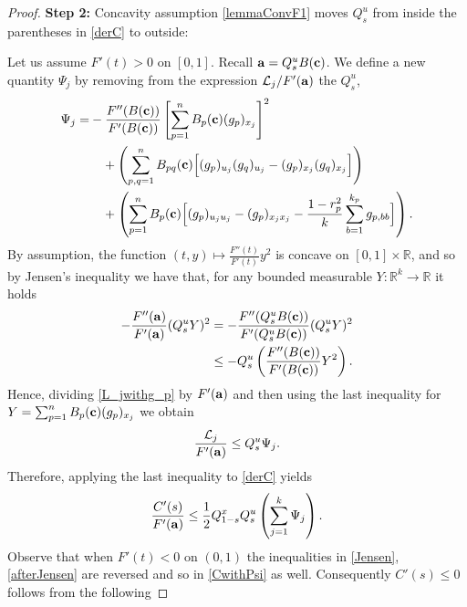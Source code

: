 \documentclass[9pt, a4paper]{amsart}
\newcommand{\R}{\mathbb{R}}
\newcommand{\1}{{\chi_{}}}%
\numberwithin{equation}{section}
\begin{document}
\begin{proof}
\vspace{0.2cm}


{\textbf{Step 2:}} Concavity assumption \eqref{lemmaConvF1} moves $Q^u_s$ from inside the parentheses in \eqref{derC} to outside:

\vspace{0.2cm}



Let us assume $F'(t)>0$ on $[0,1]$. Recall ${\bf{a}}=Q_{s}^{u}B({\bf{c}})$. We define a new quantity $\Psi_j$ by removing from the expression $\mathcal{L}_j/F'({\bf{a}})$ the $Q^u_s$,
\begin{align}\label{Psi_j}
	\Psi_j=&-\frac{F''({B(\bf{c}}))}{F'(B({\bf{c}}))}\left[\sum_{p=1}^nB_{p}({\bf{c}})(g_p)_{x_j}\right]^2\\   
	&\quad\nonumber+\left(\sum_{p,q=1}^{n}B_{pq}({\bf{c}})\Big[(g_p)_{u_j}(g_q)_{u_j}-(g_p)_{x_j}(g_q)_{x_j}\Big] \right)\\
	&\quad\nonumber+\left(\sum_{p=1}^nB_{p}({\bf{c}})\Big[(g_p)_{u_ju_j}-(g_p)_{x_jx_j}-\frac{1-r_p^2}{k}\sum_{b=1}^{k_p}g_{p,bb}\Big]\right).
\end{align}
By assumption, the function $(t,y)\mapsto \frac{F''(t)}{F'(t)}y^2$ is concave on $[0,1]\times \mathbb{R}$, and so by Jensen's inequality we have that, for any bounded measurable $Y:\R^k\to\R$ it holds
\begin{align}\label{Jensen}
\nonumber- \frac{F''({\bf{a}})}{F'({\bf{a}})}(Q_s^uY)^2 &=-\frac{F''(Q_{s}^{u}B({\bf{c}}))}{F'(Q_{s}^{u}B({\bf{c}}))}(Q_s^uY)^2  \\
	&\leq- Q_{s}^{u}\left( \frac{F''(B({\bf{c}}))}{F'(B({\bf{c}}))}Y^2\right).
\end{align}
Hence, dividing \eqref{L_jwithg_p} by $F'({\bf{a}})$ and then using the last inequality for $Y=\sum_{p=1}^nB_{p}({\bf{c}})(g_p)_{x_j}$ we obtain
\begin{equation}\label{afterJensen}
	\frac{\mathcal{L}_j}{F'({\bf{a}})}\leq Q_s^u\Psi_j.
\end{equation}
Therefore, applying the last inequality to \eqref{derC} yields
\begin{equation}\label{CwithPsi}
\frac{C'(s)}{F'({\bf{a}})}\leq\frac{1}{2}Q_{1-s}^xQ_s^u\left(\sum_{j=1}^k\Psi_j\right).
\end{equation}
Observe that when $F'(t)<0$ on $(0,1)$ the inequalities in \eqref{Jensen}, \eqref{afterJensen} are reversed and so in \eqref{CwithPsi} as well. Consequently $C'(s)\leq0$ follows from the following   
\vspace{0.2cm}



\end{proof}
\end{document}
